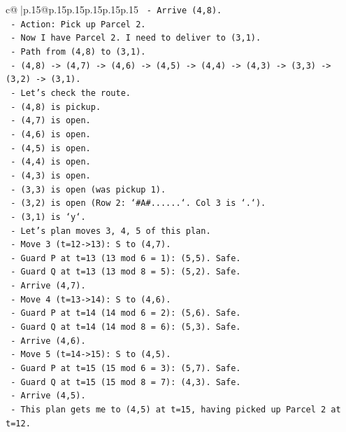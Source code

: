 \documentclass{article}
\begin{document}
{\begin{supertabular}{c@{$\;$}|p{.15\linewidth}@{}p{.15\linewidth}p{.15\linewidth}p{.15\linewidth}p{.15\linewidth}p{.15\linewidth}}
{{{\texttt{    {-} Arrive (4,8).} \\
\texttt{    {-} Action: Pick up Parcel 2.} \\
\texttt{  {-} Now I have Parcel 2. I need to deliver to (3,1).} \\
\texttt{  {-} Path from (4,8) to (3,1).} \\
\texttt{  {-} (4,8) {-}> (4,7) {-}> (4,6) {-}> (4,5) {-}> (4,4) {-}> (4,3) {-}> (3,3) {-}> (3,2) {-}> (3,1).} \\
\texttt{  {-} Let's check the route.} \\
\texttt{  {-} (4,8) is pickup.} \\
\texttt{  {-} (4,7) is open.} \\
\texttt{  {-} (4,6) is open.} \\
\texttt{  {-} (4,5) is open.} \\
\texttt{  {-} (4,4) is open.} \\
\texttt{  {-} (4,3) is open.} \\
\texttt{  {-} (3,3) is open (was pickup 1).} \\
\texttt{  {-} (3,2) is open (Row 2: `\#A\#......`. Col 3 is `.`).} \\
\texttt{  {-} (3,1) is `y`.} \\
\texttt{  {-} Let's plan moves 3, 4, 5 of this plan.} \\
\texttt{  {-} Move 3 (t=12{-}>13): S to (4,7).} \\
\texttt{    {-} Guard P at t=13 (13 mod 6 = 1): (5,5). Safe.} \\
\texttt{    {-} Guard Q at t=13 (13 mod 8 = 5): (5,2). Safe.} \\
\texttt{    {-} Arrive (4,7).} \\
\texttt{  {-} Move 4 (t=13{-}>14): S to (4,6).} \\
\texttt{    {-} Guard P at t=14 (14 mod 6 = 2): (5,6). Safe.} \\
\texttt{    {-} Guard Q at t=14 (14 mod 8 = 6): (5,3). Safe.} \\
\texttt{    {-} Arrive (4,6).} \\
\texttt{  {-} Move 5 (t=14{-}>15): S to (4,5).} \\
\texttt{    {-} Guard P at t=15 (15 mod 6 = 3): (5,7). Safe.} \\
\texttt{    {-} Guard Q at t=15 (15 mod 8 = 7): (4,3). Safe.} \\
\texttt{    {-} Arrive (4,5).} \\
\texttt{  {-} This plan gets me to (4,5) at t=15, having picked up Parcel 2 at t=12.} \\
}}}
\end{supertabular}}
\end{document}
